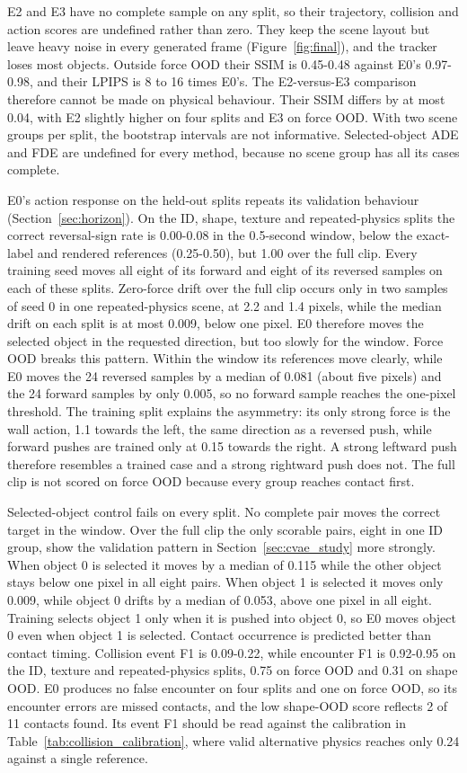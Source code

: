 \documentclass[11pt,a4paper]{article}
\begin{document}
E2 and E3 have no complete sample on any split, so their trajectory, collision and action scores are undefined rather than zero. They keep the scene layout but leave heavy noise in every generated frame (Figure~\ref{fig:final}), and the tracker loses most objects. Outside force OOD their SSIM is 0.45-0.48 against E0's 0.97-0.98, and their LPIPS is 8 to 16 times E0's. The E2-versus-E3 comparison therefore cannot be made on physical behaviour. Their SSIM differs by at most 0.04, with E2 slightly higher on four splits and E3 on force OOD. With two scene groups per split, the bootstrap intervals are not informative. Selected-object ADE and FDE are undefined for every method, because no scene group has all its cases complete.

E0's action response on the held-out splits repeats its validation behaviour (Section~\ref{sec:horizon}). On the ID, shape, texture and repeated-physics splits the correct reversal-sign rate is 0.00-0.08 in the 0.5-second window, below the exact-label and rendered references (0.25-0.50), but 1.00 over the full clip. Every training seed moves all eight of its forward and eight of its reversed samples on each of these splits. Zero-force drift over the full clip occurs only in two samples of seed 0 in one repeated-physics scene, at 2.2 and 1.4 pixels, while the median drift on each split is at most 0.009, below one pixel. E0 therefore moves the selected object in the requested direction, but too slowly for the window. Force OOD breaks this pattern. Within the window its references move clearly, while E0 moves the 24 reversed samples by a median of 0.081 (about five pixels) and the 24 forward samples by only 0.005, so no forward sample reaches the one-pixel threshold. The training split explains the asymmetry: its only strong force is the wall action, 1.1 towards the left, the same direction as a reversed push, while forward pushes are trained only at 0.15 towards the right. A strong leftward push therefore resembles a trained case and a strong rightward push does not. The full clip is not scored on force OOD because every group reaches contact first.

Selected-object control fails on every split. No complete pair moves the correct target in the window. Over the full clip the only scorable pairs, eight in one ID group, show the validation pattern in Section~\ref{sec:cvae_study} more strongly. When object 0 is selected it moves by a median of 0.115 while the other object stays below one pixel in all eight pairs. When object 1 is selected it moves only 0.009, while object 0 drifts by a median of 0.053, above one pixel in all eight. Training selects object 1 only when it is pushed into object 0, so E0 moves object 0 even when object 1 is selected. Contact occurrence is predicted better than contact timing. Collision event F1 is 0.09-0.22, while encounter F1 is 0.92-0.95 on the ID, texture and repeated-physics splits, 0.75 on force OOD and 0.31 on shape OOD. E0 produces no false encounter on four splits and one on force OOD, so its encounter errors are missed contacts, and the low shape-OOD score reflects 2 of 11 contacts found. Its event F1 should be read against the calibration in Table~\ref{tab:collision_calibration}, where valid alternative physics reaches only 0.24 against a single reference.
\end{document}
